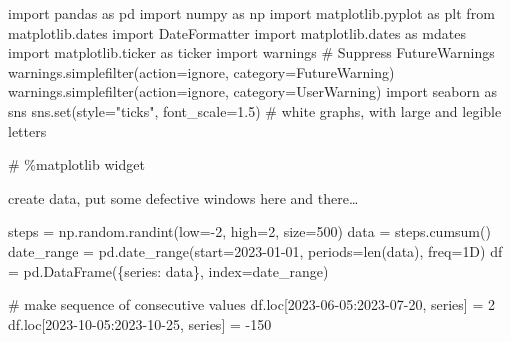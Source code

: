 \documentclass[
  letterpaper,
  DIV=11,
  numbers=noendperiod,
  oneside]{scrreprt}
\newenvironment{Shaded}{\begin{snugshade}}{\end{snugshade}}
\newcommand{\BuiltInTok}[1]{\textcolor[rgb]{0.00,0.23,0.31}{#1}}
\newcommand{\CommentTok}[1]{\textcolor[rgb]{0.37,0.37,0.37}{#1}}
\newcommand{\DecValTok}[1]{\textcolor[rgb]{0.68,0.00,0.00}{#1}}
\newcommand{\FloatTok}[1]{\textcolor[rgb]{0.68,0.00,0.00}{#1}}
\newcommand{\ImportTok}[1]{\textcolor[rgb]{0.00,0.46,0.62}{#1}}
\newcommand{\NormalTok}[1]{\textcolor[rgb]{0.00,0.23,0.31}{#1}}
\newcommand{\OperatorTok}[1]{\textcolor[rgb]{0.37,0.37,0.37}{#1}}
\newcommand{\PreprocessorTok}[1]{\textcolor[rgb]{0.68,0.00,0.00}{#1}}
\newcommand{\StringTok}[1]{\textcolor[rgb]{0.13,0.47,0.30}{#1}}
\begin{document}
\begin{Shaded}
\begin{Highlighting}[]
\ImportTok{import}\NormalTok{ pandas }\ImportTok{as}\NormalTok{ pd}
\ImportTok{import}\NormalTok{ numpy }\ImportTok{as}\NormalTok{ np}
\ImportTok{import}\NormalTok{ matplotlib.pyplot }\ImportTok{as}\NormalTok{ plt}
\ImportTok{from}\NormalTok{ matplotlib.dates }\ImportTok{import}\NormalTok{ DateFormatter}
\ImportTok{import}\NormalTok{ matplotlib.dates }\ImportTok{as}\NormalTok{ mdates}
\ImportTok{import}\NormalTok{ matplotlib.ticker }\ImportTok{as}\NormalTok{ ticker}
\ImportTok{import}\NormalTok{ warnings}
\CommentTok{\# Suppress FutureWarnings}
\NormalTok{warnings.simplefilter(action}\OperatorTok{=}\StringTok{\textquotesingle{}ignore\textquotesingle{}}\NormalTok{, category}\OperatorTok{=}\PreprocessorTok{FutureWarning}\NormalTok{)}
\NormalTok{warnings.simplefilter(action}\OperatorTok{=}\StringTok{\textquotesingle{}ignore\textquotesingle{}}\NormalTok{, category}\OperatorTok{=}\PreprocessorTok{UserWarning}\NormalTok{)}
\ImportTok{import}\NormalTok{ seaborn }\ImportTok{as}\NormalTok{ sns}
\NormalTok{sns.}\BuiltInTok{set}\NormalTok{(style}\OperatorTok{=}\StringTok{"ticks"}\NormalTok{, font\_scale}\OperatorTok{=}\FloatTok{1.5}\NormalTok{)  }\CommentTok{\# white graphs, with large and legible letters}

\CommentTok{\# \%matplotlib widget}
\end{Highlighting}
\end{Shaded}

create data, put some defective windows here and there\ldots{}

\begin{Shaded}
\begin{Highlighting}[]
\NormalTok{steps }\OperatorTok{=}\NormalTok{ np.random.randint(low}\OperatorTok{={-}}\DecValTok{2}\NormalTok{, high}\OperatorTok{=}\DecValTok{2}\NormalTok{, size}\OperatorTok{=}\DecValTok{500}\NormalTok{)}
\NormalTok{data }\OperatorTok{=}\NormalTok{ steps.cumsum()}
\NormalTok{date\_range }\OperatorTok{=}\NormalTok{ pd.date\_range(start}\OperatorTok{=}\StringTok{\textquotesingle{}2023{-}01{-}01\textquotesingle{}}\NormalTok{, periods}\OperatorTok{=}\BuiltInTok{len}\NormalTok{(data), freq}\OperatorTok{=}\StringTok{\textquotesingle{}1D\textquotesingle{}}\NormalTok{)}
\NormalTok{df }\OperatorTok{=}\NormalTok{ pd.DataFrame(\{}\StringTok{\textquotesingle{}series\textquotesingle{}}\NormalTok{: data\}, index}\OperatorTok{=}\NormalTok{date\_range)}

\CommentTok{\# make sequence of consecutive values}
\NormalTok{df.loc[}\StringTok{\textquotesingle{}2023{-}06{-}05\textquotesingle{}}\NormalTok{:}\StringTok{\textquotesingle{}2023{-}07{-}20\textquotesingle{}}\NormalTok{, }\StringTok{\textquotesingle{}series\textquotesingle{}}\NormalTok{] }\OperatorTok{=} \DecValTok{2}
\NormalTok{df.loc[}\StringTok{\textquotesingle{}2023{-}10{-}05\textquotesingle{}}\NormalTok{:}\StringTok{\textquotesingle{}2023{-}10{-}25\textquotesingle{}}\NormalTok{, }\StringTok{\textquotesingle{}series\textquotesingle{}}\NormalTok{] }\OperatorTok{=} \OperatorTok{{-}}\DecValTok{150}
\end{Highlighting}
\end{Shaded}
\end{document}
